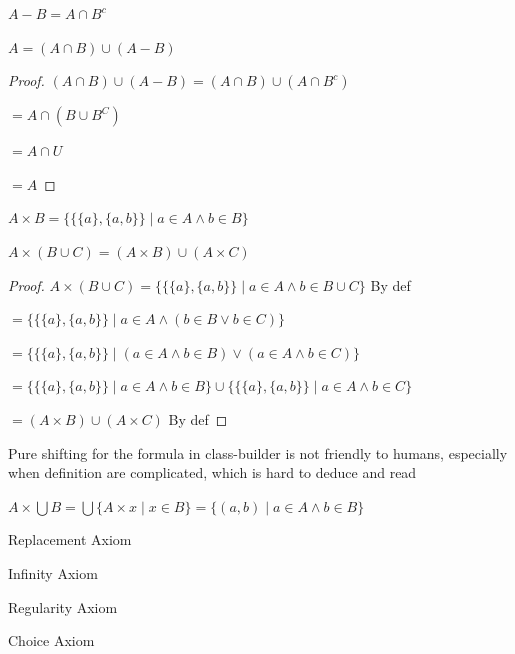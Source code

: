\documentclass[12pt, a4paper, oneside]{article}
\begin{document}
    \begin{remark}
        $A - B = A \cap B^c$
    \end{remark}

    \begin{theorem}
        $A = (A \cap B) \cup (A - B)$
    \end{theorem}

    \begin{proof}
        $(A \cap B) \cup (A - B) = (A \cap B) \cup (A \cap B^c)$

        $= A \cap (B \cup B^C)$

        $= A \cap U$

        $= A$
    \end{proof}

    \begin{remark}
        $A \times B = \{\{\{a\}, \{a ,b\}\} \mid a \in A \wedge b \in B\}$
    \end{remark}
    
    \begin{theorem}
        $A \times (B \cup C) = (A \times B) \cup (A \times C)$
    \end{theorem}

    \begin{proof}
        $A \times (B \cup C) = \{\{\{a\}, \{a ,b\}\} \mid a \in A \wedge b \in B \cup C\}$ By def

        $= \{\{\{a\}, \{a ,b\}\} \mid a \in A \wedge (b \in B \vee b \in C)\}$

        $= \{\{\{a\}, \{a ,b\}\} \mid (a \in A \wedge b \in B) \vee (a \in A \wedge b \in C)\}$

        $= \{\{\{a\}, \{a ,b\}\} \mid a \in A \wedge b \in B \}  \cup \{\{\{a\}, \{a ,b\}\} \mid a \in A \wedge b \in C\}$

        $= (A \times B) \cup (A \times C)$ By def
    \end{proof}

    \begin{remark}
        Pure shifting for the formula in class-builder is not friendly to humans, especially when definition are complicated, which is hard to deduce and read
    \end{remark}

    \begin{theorem}
        $A \times \bigcup B = \bigcup\{A \times x \mid x \in B\} = \{(a, b)\mid a\in A \wedge b \in B\}$
    \end{theorem} 

    \begin{axiom}
        Replacement Axiom
    \end{axiom}

    \begin{axiom}
        Infinity Axiom
    \end{axiom}
        
    \begin{axiom}
        Regularity Axiom
    \end{axiom}

    \begin{axiom}
        Choice Axiom
    \end{axiom}

    
    
\end{document}
